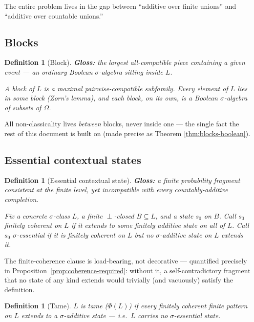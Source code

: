 \documentclass[11pt]{article}
\newtheorem{definition}[theorem]{Definition}
\theoremstyle{remark}
\begin{document}
The entire problem lives in the gap between ``additive over finite unions''
and ``additive over countable unions.''

\subsection{Blocks}

\begin{definition}[Block]
\label{def:block}
\textbf{Gloss:} the largest all-compatible piece containing a given event —
an ordinary Boolean $\sigma$-algebra sitting inside $L$.

\smallskip
\noindent A \emph{block} of $L$ is a maximal pairwise-compatible subfamily.
Every element of $L$ lies in some block (Zorn's lemma), and each block, on
its own, is a Boolean $\sigma$-algebra of subsets of $\Omega$.
\end{definition}

All non-classicality lives \emph{between} blocks, never inside one — the
single fact the rest of this document is built on (made precise as Theorem
\ref{thm:blocks-boolean}).

\subsection{Essential contextual states}

\begin{definition}[Essential contextual state]
\label{def:essential}
\textbf{Gloss:} a finite probability fragment consistent at the finite level,
yet incompatible with \emph{every} countably-additive completion.

\smallskip
\noindent Fix a concrete $\sigma$-class $L$, a finite $\perp$-closed
$B\subseteq L$, and a state $s_0$ on $B$. Call $s_0$ \emph{finitely coherent
on $L$} if it extends to some finitely additive state on all of $L$. Call
$s_0$ \emph{$\sigma$-essential} if it is finitely coherent on $L$ but no
$\sigma$-additive state on $L$ extends it.
\end{definition}

The finite-coherence clause is load-bearing, not decorative — quantified
precisely in Proposition~\ref{prop:coherence-required}: without it, a
self-contradictory fragment that no state of any kind extends would trivially
(and vacuously) satisfy the definition.

\begin{definition}[Tame]
\label{def:tame}
$L$ is \emph{tame} ($\Phi(L)$) if every finitely coherent finite pattern on
$L$ extends to a $\sigma$-additive state — i.e.\ $L$ carries no
$\sigma$-essential state.
\end{definition}
\end{document}
